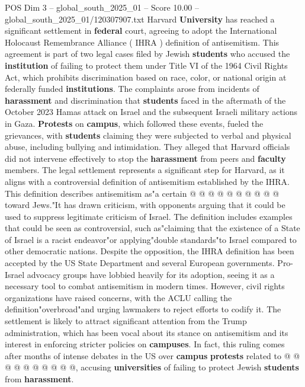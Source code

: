 \begin{textsample}{POS Dim 3 – global\_south\_2025\_01 – Score 10.00 – global\_south\_2025\_01/120307907.txt}  \label{ex:f3_pos_404}
Harvard \textbf{University} has reached a significant settlement in \textbf{federal} court, agreeing to adopt the International Holocaust Remembrance Alliance ( IHRA ) definition of antisemitism.
This agreement is part of two legal cases filed by Jewish \textbf{students} who accused the \textbf{institution} of failing to protect them under Title VI of the 1964 Civil Rights Act, which prohibits discrimination based on race, color, or national origin at federally funded \textbf{institutions}.
The complaints arose from incidents of \textbf{harassment} and discrimination that \textbf{students} faced in the aftermath of the October 2023 Hamas attack on Israel and the subsequent Israeli military actions in Gaza. \textbf{Protests} on \textbf{campus}, which followed these events, fueled the grievances, with \textbf{students} claiming they were subjected to verbal and physical abuse, including bullying and intimidation.
They alleged that Harvard officials did not intervene effectively to stop the \textbf{harassment} from peers and \textbf{faculty} members.
The legal settlement represents a significant step for Harvard, as it aligns with a controversial definition of antisemitism established by the IHRA.
This definition describes antisemitism as"a certain @ @ @ @ @ @ @ @ @ @ toward Jews."It has drawn criticism, with opponents arguing that it could be used to suppress legitimate criticism of Israel.
The definition includes examples that could be seen as controversial, such as"claiming that the existence of a State of Israel is a racist endeavor"or applying"double standards"to Israel compared to other democratic nations.
Despite the opposition, the IHRA definition has been accepted by the US State Department and several European governments.
Pro-Israel advocacy groups have lobbied heavily for its adoption, seeing it as a necessary tool to combat antisemitism in modern times.
However, civil rights organizations have raised concerns, with the ACLU calling the definition"overbroad"and urging lawmakers to reject efforts to codify it.
The settlement is likely to attract significant attention from the Trump administration, which has been vocal about its stance on antisemitism and its interest in enforcing stricter policies on \textbf{campuses}.
In fact, this ruling comes after months of intense debates in the US over \textbf{campus} \textbf{protests} related to @ @ @ @ @ @ @ @ @ @, accusing \textbf{universities} of failing to protect Jewish \textbf{students} from \textbf{harassment}.

\end{textsample}
